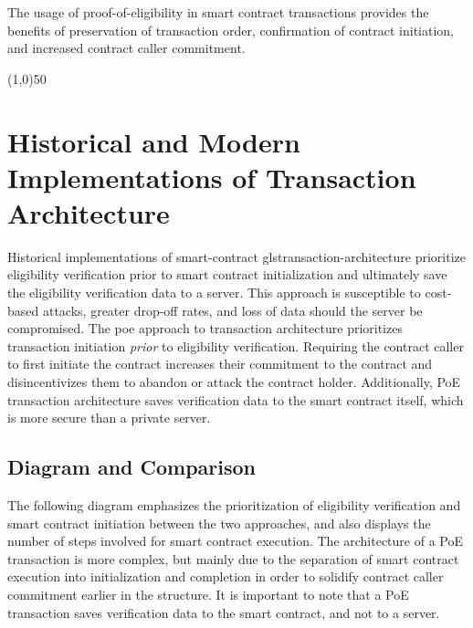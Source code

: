 \documentclass{article}
\begin{document}
The usage of \Gls{proof-of-eligibility} in smart contract transactions provides the benefits of preservation of transaction order, confirmation of contract initiation, and increased contract caller commitment.

\begin{center}
\line(1,0){50}
\end{center}

\section{Historical and Modern Implementations of Transaction Architecture}
Historical implementations of \gls{smart-contract} gls{transaction-architecture} prioritize eligibility verification prior to smart contract initialization and ultimately save the eligibility verification data to a server. This approach is susceptible to cost-based attacks, greater drop-off rates, and loss of data should the server be compromised. The \acrlong{poe} approach to transaction architecture prioritizes transaction initiation \textit{prior} to eligibility verification. Requiring the contract caller to first initiate the contract increases their commitment to the contract and disincentivizes them to abandon or attack the contract holder. Additionally, PoE transaction architecture saves verification data to the smart contract itself, which is more secure than a private server.

\subsection{Diagram and Comparison}
The following diagram emphasizes the prioritization of eligibility verification and smart contract initiation between the two approaches, and also displays the number of steps involved for smart contract execution. The architecture of a PoE transaction is more complex, but mainly due to the separation of smart contract execution into initialization and completion in order to solidify contract caller commitment earlier in the structure. It is important to note that a PoE transaction saves verification data to the smart contract, and not to a server.

\clearpage
\end{document}
